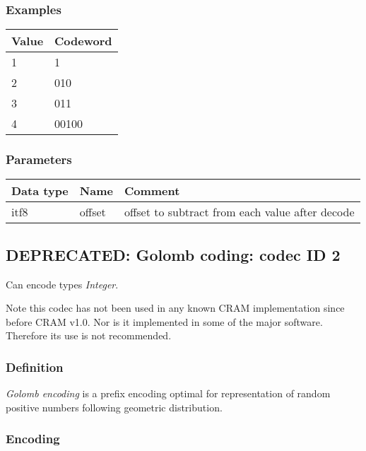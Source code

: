 \documentclass[a4paper]{article}
\begin{document}
\subsubsection*{Examples}

\begin{tabular}{|>{\raggedright}p{76pt}|>{\raggedright}p{107pt}|}
\hline
\textbf{Value} & \textbf{Codeword}\tabularnewline
\hline
1 & 1\tabularnewline
\hline
2 & 010\tabularnewline
\hline
3 & 011\tabularnewline
\hline
4 & 00100\tabularnewline
\hline
\end{tabular}

\subsubsection*{Parameters}

\begin{tabular}{|>{\raggedright}p{144pt}|>{\raggedright}p{144pt}|>{\raggedright}p{144pt}|}
\hline
\textbf{Data type} & \textbf{Name} & \textbf{Comment}\tabularnewline
\hline
itf8 & offset & offset to subtract from each value after decode\tabularnewline
\hline
\end{tabular}

\subsection{DEPRECATED: Golomb coding: codec ID 2}

Can encode types \textit{Integer}.

Note this codec has not been used in any known CRAM implementation since before CRAM v1.0.
Nor is it implemented in some of the major software.
Therefore its use is not recommended.

\subsubsection*{Definition}

\emph{Golomb encoding} is a prefix encoding optimal for representation of random 
positive numbers following geometric distribution. 

\subsubsection*{Encoding}
\end{document}
